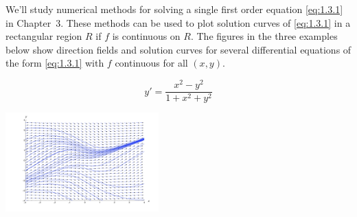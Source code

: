 \documentclass{ximera}
\begin{document}
We'll  study numerical methods for solving a single first order
equation \eqref{eq:1.3.1} in {\color{red}Chapter~3}. These methods can be
used
to plot solution curves of \eqref{eq:1.3.1} in a rectangular region $R$ if $f$ is continuous on $R$. The figures in the three examples below show direction fields and solution
curves for several differential equations of the form \eqref{eq:1.3.1} with $f$
 continuous for all $(x,y)$.
 \begin{example}\label{ex:fig010302}
$$
 y'=\frac{x^2-y^2}{1+x^2+y^2}
 $$
 \begin{image}
  \includegraphics[height=1.5in]{fig010302.jpg}
\end{image}
\end{example}
\end{document}
